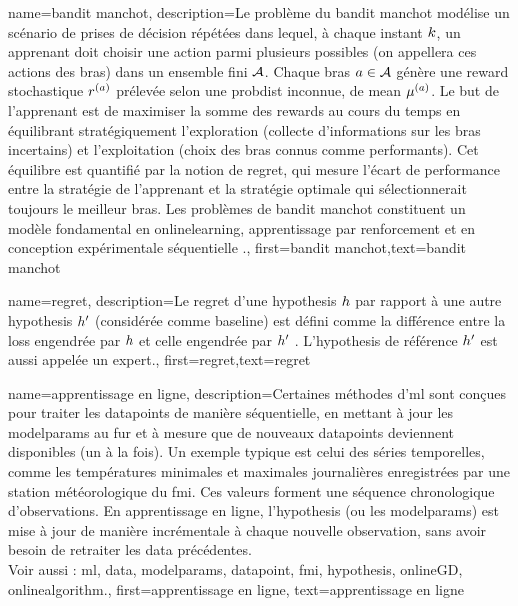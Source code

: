 
{
	name={bandit manchot},
	description={Le problème du bandit manchot modélise un scénario 
		de prises de décision répétées dans lequel, à chaque instant $k$, un apprenant doit 
		choisir une action parmi plusieurs possibles (on appellera ces actions des bras) dans un ensemble fini $\mathcal{A}$. 
		Chaque bras $a \in \mathcal{A}$ génère une \gls{reward} stochastique $r^{(a)}$ 
		prélevée selon une \gls{probdist} inconnue, de \gls{mean} $\mu^{(a)}$. 
		Le but de l’apprenant est de maximiser la somme des \glspl{reward} au cours du temps en équilibrant 
		stratégiquement l’exploration (collecte d’informations sur les bras incertains) et 
		l’exploitation (choix des bras connus comme performants). 
		Cet équilibre est quantifié par la notion de \gls{regret}, qui mesure l’écart de performance 
		entre la stratégie de l’apprenant et la stratégie optimale qui sélectionnerait toujours le meilleur bras. 
		Les problèmes de bandit manchot constituent un modèle fondamental en \gls{onlinelearning}, 
		apprentissage par renforcement et en conception expérimentale séquentielle \cite{Bubeck2012}.},
	first={bandit manchot},text={bandit manchot}
}

{	name={regret},
	description={Le regret d’une \gls{hypothesis} $h$ par rapport à 
		une autre \gls{hypothesis} $h'$ (considérée comme \gls{baseline}) 
		est défini comme la différence entre la \gls{loss} engendrée par $h$ 
		et celle engendrée par $h'$ \cite{PredictionLearningGames}. 
		L'\gls{hypothesis} de référence $h'$ est aussi appelée un \gls{expert}.},
	first={regret},text={regret}
}

{
	name={apprentissage en ligne},
	description={Certaines méthodes d’\gls{ml}  sont conçues pour traiter les \glspl{datapoint} 
		de manière séquentielle, en mettant à jour les \gls{modelparams} au fur et à mesure que 
		de nouveaux \glspl{datapoint} deviennent disponibles (un à la fois). 
		Un exemple typique est celui des séries temporelles, comme les températures minimales et maximales
		journalières enregistrées par une station météorologique du \gls{fmi}. Ces valeurs forment 
		une séquence chronologique d’observations. En apprentissage en ligne, l’\gls{hypothesis} (ou les \gls{modelparams}) 
		est mise à jour de manière incrémentale à chaque nouvelle observation, sans avoir besoin de 
		retraiter les \gls{data} précédentes. \\
		Voir aussi : \gls{ml}, \gls{data}, \gls{modelparams}, \gls{datapoint}, \gls{fmi}, \gls{hypothesis}, \gls{onlineGD}, \gls{onlinealgorithm}.},
	first={apprentissage en ligne},
	text={apprentissage en ligne}
}


